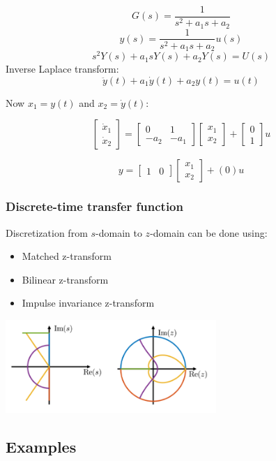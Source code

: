 $$G(s)=\frac{1}{s^2+a_1s+a_2}$$
$$y(s)=\frac{1}{s^2+a_1s+a_2}u(s)$$
$$s^2Y(s)+a_1sY(s)+a_2Y(s)=U(s)$$
Inverse Laplace transform:
$$\ddot{y}(t)+a_1\dot{y}(t)+a_2y(t)=u(t)$$

Now $x_1=y(t)$ and $x_2=\dot{y}(t)$:

$$\begin{bmatrix}
		\dot{x}_1 \\
		\dot{x}_2
	\end{bmatrix}=\begin{bmatrix}
		0    & 1    \\
		-a_2 & -a_1
	\end{bmatrix}\begin{bmatrix}
		x_1 \\
		x_2
	\end{bmatrix}+\begin{bmatrix}
		0 \\
		1
	\end{bmatrix}
	u
$$

$$y=\begin{bmatrix}
		1 & 0
	\end{bmatrix}\begin{bmatrix}
		x_1 \\
		x_2
	\end{bmatrix}+(0)u$$

\subsubsection{Discrete-time transfer function}
Discretization from $s$-domain to $z$-domain can be done using:
\begin{itemize}
	\item Matched z-transform
	\item Bilinear z-transform
	\item Impulse invariance z-transform
\end{itemize}
\begin{center}
	\includegraphics[width=0.6\textwidth]{Images/s-to-z.png}
\end{center}

\subsection{Examples}
